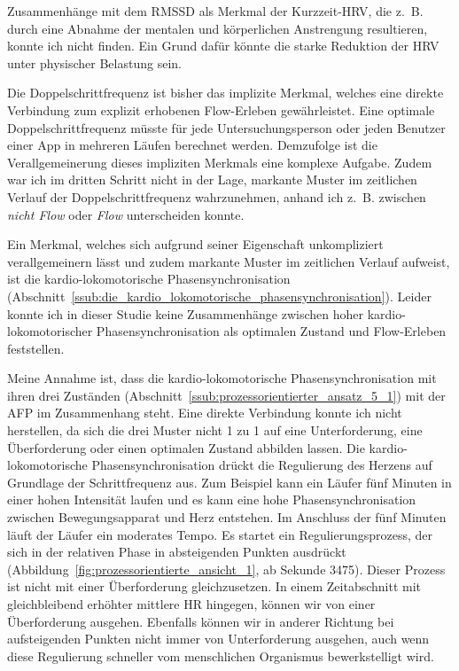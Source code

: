Zusammenhänge mit dem \acs{RMSSD} als Merkmal der Kurzzeit-\ac{HRV}, die z.~B. durch eine Abnahme der mentalen und körperlichen Anstrengung resultieren, konnte ich nicht finden. Ein Grund dafür könnte die starke Reduktion der \ac{HRV} unter physischer Belastung sein.

Die Doppelschrittfrequenz ist bisher das implizite Merkmal, welches eine direkte Verbindung zum explizit erhobenen Flow-Erleben gewährleistet. Eine optimale Doppelschrittfrequenz müsste für jede Untersuchungsperson oder jeden Benutzer einer App in mehreren Läufen berechnet werden. Demzufolge ist die Verallgemeinerung dieses impliziten Merkmals eine komplexe Aufgabe. Zudem war ich im dritten Schritt nicht in der Lage, markante Muster im zeitlichen Verlauf der Doppelschrittfrequenz wahrzunehmen, anhand ich z.~B. zwischen \emph{nicht Flow} oder \emph{Flow} unterscheiden konnte.

Ein Merkmal, welches sich aufgrund seiner Eigenschaft unkompliziert verallgemeinern lässt und zudem markante Muster im zeitlichen Verlauf aufweist, ist die kardio-lokomotorische Phasensynchronisation (Abschnitt~\ref{ssub:die_kardio_lokomotorische_phasensynchronisation}). Leider konnte ich in dieser Studie keine Zusammenhänge zwischen hoher kardio-lokomotorischer Phasensynchronisation als optimalen Zustand und Flow-Erleben feststellen. 

Meine Annahme ist, dass die kardio-lokomotorische Phasensynchronisation mit ihren drei Zuständen (Abschnitt~\ref{ssub:prozessorientierter_ansatz_5_1}) mit der \ac{AFP} im Zusammenhang steht. Eine direkte Verbindung konnte ich nicht herstellen, da sich die drei Muster nicht 1 zu 1 auf eine Unterforderung, eine Überforderung oder einen optimalen Zustand abbilden lassen. Die kardio-lokomotorische Phasensynchronisation drückt die Regulierung des Herzens auf Grundlage der Schrittfrequenz aus. Zum Beispiel kann ein Läufer fünf Minuten in einer hohen Intensität laufen und es kann eine hohe Phasensynchronisation zwischen Bewegungsapparat und Herz entstehen. Im Anschluss der fünf Minuten läuft der Läufer ein moderates Tempo. Es startet ein Regulierungsprozess, der sich in der relativen Phase in absteigenden Punkten ausdrückt (Abbildung~\ref{fig:prozessorientierte_ansicht_1}, ab Sekunde 3475). Dieser Prozess ist nicht mit einer Überforderung gleichzusetzen. In einem Zeitabschnitt mit gleichbleibend erhöhter mittlere \ac{HR} hingegen, können wir von einer Überforderung ausgehen. Ebenfalls können wir in anderer Richtung bei aufsteigenden Punkten nicht immer von Unterforderung ausgehen, auch wenn diese Regulierung schneller vom menschlichen Organismus bewerkstelligt wird.

